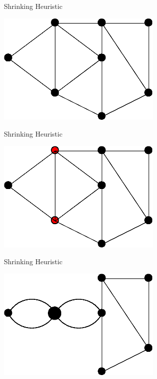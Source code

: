 \documentclass[10pt]{beamer}
\begin{document}
\begin{frame}{Shrinking Heuristic}
\begin{example}
    \begin{center}
            \includegraphics[width=8cm]{Shrinking00.eps} 
    \end{center}
\end{example}
\end{frame}

\begin{frame}{Shrinking Heuristic}
\begin{example}
    \begin{center}
            \includegraphics[width=8cm]{Shrinking01.eps} 
    \end{center}
\end{example}
\end{frame}

\begin{frame}{Shrinking Heuristic}
\begin{example}
    \begin{center}
            \includegraphics[width=8cm]{Shrinking02.eps} 
    \end{center}
\end{example}
\end{frame}
\end{document}
